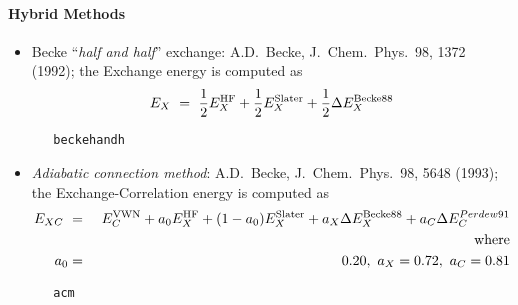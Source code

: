 \paragraph{Hybrid Methods}

\begin{itemize}
\item Becke ``{\sl half and half}'' exchange:
  A.D.~Becke, J.~Chem.~Phys.~98, 1372 (1992); the Exchange energy is
  computed as
\begin{eqnarray*}
E_{X} \ = \ \frac{1}{2} E^{\rm HF}_X + \frac{1}{2} E^{\rm Slater}_{X} +
\frac{1}{2} \Delta E^{\rm Becke88}_{X} 
\end{eqnarray*}

\begin{verbatim}
   beckehandh
\end{verbatim}

\item {\sl Adiabatic connection method}:
  A.D.~Becke, J.~Chem.~Phys.~98, 5648 (1993); the Exchange-Correlation
 energy is  computed as
\begin{eqnarray*}
E_{XC} \ &=& \ E^{\rm VWN}_C + a_0 E^{\rm HF}_X + (1-a_0) E^{\rm Slater}_{X} +
a_X \Delta E^{\rm Becke88}_{X} + a_C \Delta E^{Perdew91}_C \\
& &{\rm where } \\
a_0 &=& 0.20, \ a_X = 0.72, \ a_C = 0.81
\end{eqnarray*}



\begin{verbatim}
   acm
\end{verbatim}

\end{itemize}

